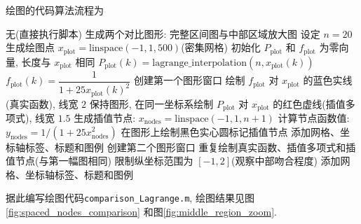 \documentclass[zihao=-4,a4paper]{ctexart}
\begin{document}
绘图的代码算法流程为
\begin{center}
  \begin{minipage}{0.8\textwidth}
    \begin{algorithm}[H]
      \caption{$n=20$ 时 Lagrange 插值多项式与真实函数曲线对比}
      \begin{algorithmic}[1]
      \Require 无(直接执行脚本)
      \Ensure 生成两个对比图形: 完整区间图与中部区域放大图
      \State 设定 $n = 20$
      \State 生成绘图点 $x_{\text{plot}} = \text{linspace}(-1, 1, 500)$(密集网格)
      \State 初始化 $P_{\text{plot}}$ 和 $f_{\text{plot}}$ 为零向量, 长度与 $x_{\text{plot}}$ 相同
          \State $P_{\text{plot}}(k) = \text{lagrange\_interpolation}(n, x_{\text{plot}}(k))$
          \State $f_{\text{plot}}(k) = \dfrac{1}{1+25x_{\text{plot}}(k)^2}$
      \EndFor
      \State 创建第一个图形窗口
      \State 绘制 $f_{\text{plot}}$ 对 $x_{\text{plot}}$ 的蓝色实线(真实函数), 线宽 $2$
      \State 保持图形, 在同一坐标系绘制 $P_{\text{plot}}$ 对 $x_{\text{plot}}$ 的红色虚线(插值多项式), 线宽 $1.5$
      \State 生成插值节点: $x_{\text{nodes}} = \text{linspace}(-1, 1, n+1)$
      \State 计算节点函数值: $y_{\text{nodes}} = 1/(1+25x_{\text{nodes}}^2)$
      \State 在图形上绘制黑色实心圆标记插值节点
      \State 添加网格、坐标轴标签、标题和图例
      \State 创建第二个图形窗口
      \State 重复绘制真实函数、插值多项式和插值节点(与第一幅图相同)
      \State 限制纵坐标范围为 $[-1, 2]$(观察中部吻合程度)
      \State 添加网格、坐标轴标签、标题和图例
      \end{algorithmic}
    \end{algorithm}
  \end{minipage}
\end{center}

据此编写绘图代码\verb|comparison_Lagrange.m|, 绘图结果见图\ref{fig:spaced_nodes_comparison} 和图\ref{fig:middle_region_zoom}.


\end{document}
